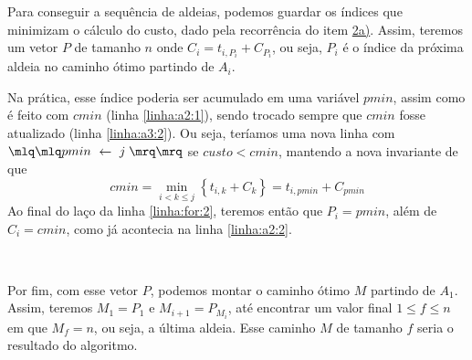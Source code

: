 Para conseguir a sequência de aldeias, podemos guardar os índices que minimizam o cálculo do custo, dado pela recorrência do item \hyperref[sec:2:a]{2a)}. Assim, teremos um vetor $P$ de tamanho $n$ onde $C_i = t_{i, P_i} + C_{P_i}$, ou seja, $P_i$ é o índice da próxima aldeia no caminho ótimo partindo de $A_i$.

Na prática, esse índice poderia ser acumulado em uma variável $pmin$, assim como é feito com $cmin$ (linha \ref{linha:a2:1}), sendo trocado sempre que $cmin$ fosse atualizado (linha \ref{linha:a3:2}). Ou seja, teríamos uma nova linha com $\mlq\mlq pmin \gets j \;\mrq\mrq$ se $custo < cmin$, mantendo a nova invariante de que
\[
    cmin = \min_{i < k \leq j} \left\{t_{i, k} + C_k\right\} = t_{i, pmin} + C_{pmin}
\]
Ao final do laço da linha \ref{linha:for:2}, teremos então que $P_i = pmin$, além de $C_i = cmin$, como já acontecia na linha \ref{linha:a2:2}.

~

Por fim, com esse vetor $P$, podemos montar o caminho ótimo $M$ partindo de $A_1$. Assim, teremos $M_1 = P_1$ e $M_{i + 1} = P_{M_i}$, até encontrar um valor final $1 \leq f \leq n$ em que $M_f = n$, ou seja, a última aldeia. Esse caminho $M$ de tamanho $f$ seria o resultado do algoritmo.

